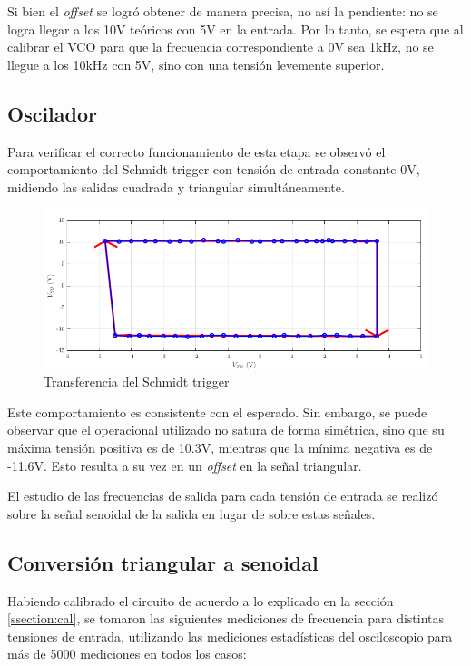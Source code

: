\documentclass[../../tc_tp6_main.tex]{subfiles}
\begin{document}
Si bien el \textit{offset} se logr\'o obtener de manera precisa, no as\'i la pendiente: no se logra llegar a los 10V te\'oricos con 5V en la entrada. Por lo tanto, se espera que al calibrar el VCO para que la frecuencia correspondiente a 0V sea 1kHz, no se llegue a los 10kHz con 5V, sino con una tensi\'on levemente superior.

\subsection{Oscilador}

Para verificar el correcto funcionamiento de esta etapa se observ\'o el comportamiento del Schmidt trigger con tensi\'on de entrada constante 0V, midiendo las salidas cuadrada y triangular simult\'aneamente.

\begin{figure}[H]
	\centering
	\includegraphics[scale=0.71]{imagenes/tc_tp6_ej3_st.png}
	\caption{Transferencia del Schmidt trigger}
\end{figure}

Este comportamiento es consistente con el esperado. Sin embargo, se puede observar que el operacional utilizado no satura de forma sim\'etrica, sino que su m\'axima tensi\'on positiva es de 10.3V, mientras que la m\'inima negativa es de -11.6V. Esto resulta a su vez en un \textit{offset} en la se\~nal triangular. \par

El estudio de las frecuencias de salida para cada tensi\'on de entrada se realiz\'o sobre la se\~nal senoidal de la salida en lugar de sobre estas se\~nales. 

\subsection{Conversi\'on triangular a senoidal}

Habiendo calibrado el circuito de acuerdo a lo explicado en la secci\'on \ref{ssection:cal}, se tomaron las siguientes mediciones de frecuencia para distintas tensiones de entrada, utilizando las mediciones estad\'isticas del osciloscopio para m\'as de 5000 mediciones en todos los casos:
\end{document}
